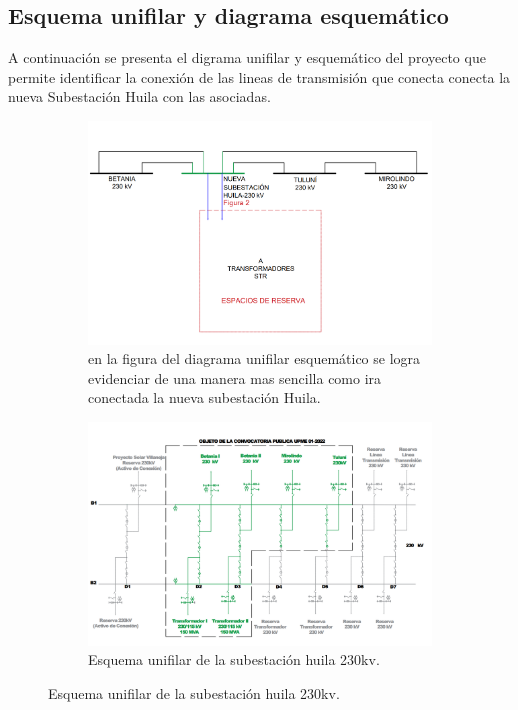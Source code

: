 \subsection*{Esquema unifilar y diagrama esquemático}
A continuación se presenta el digrama unifilar y esquemático del proyecto que permite identificar la conexión de las lineas de transmisión que conecta conecta la nueva Subestación Huila con las asociadas.
\begin{figure}[h!] %
    \centering %
    \begin{subfigure}{0.5\textwidth}
        \includegraphics[width=1\textwidth]{1mer avance foticos/Esquema unifilar diagrama esquemático.png}
        \caption{en la figura del diagrama unifilar esquemático se logra evidenciar de una manera mas sencilla como ira conectada la nueva subestación Huila.} %
        \label{fig:Esquema} %
    \end{subfigure}
    \hfill %
    \begin{subfigure}{0.5\textwidth}
        \centering %
        \includegraphics[width=1\textwidth]{1mer avance foticos/Esquema unifilar de la subestación huila 230kv.png}
        \caption{Esquema unifilar de la subestación huila 230kv.} %
        \label{fig:unifilar} %
    \end{subfigure}
    \label{fig:dos-imagenes}
\end{figure}

